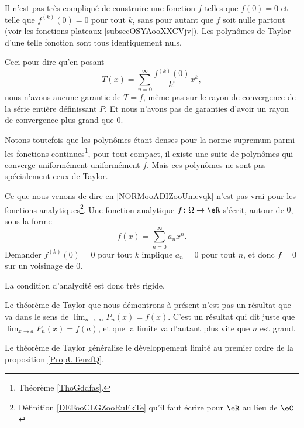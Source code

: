 \begin{normaltext}      \label{NORMooADIZooUmevqk}
    Il n'est pas très compliqué de construire une fonction \( f\) telles que \( f(0)=0\) et telle que \( f^{(k)}(0)=0\) pour tout \( k\), sans pour autant que \( f\) soit nulle partout (voir les fonctions plateaux \ref{subsecOSYAooXXCVjv}). Les polynômes de Taylor d'une telle fonction sont tous identiquement nuls.

    Ceci pour dire qu'en posant
    \begin{equation}
        T(x)=\sum_{n=0}^{\infty}\frac{ f^{(k)}(0) }{ k! }x^k,
    \end{equation}
    nous n'avons aucune garantie de \( T=f\), même pas sur le rayon de convergence de la série entière définissant \( P\). Et nous n'avons pas de garanties d'avoir un rayon de convergence plus grand que \( 0\).

    Notons toutefois que les polynômes étant denses pour la norme supremum parmi les fonctions continues\footnote{Théorème \ref{ThoGddfas}.}, pour tout compact, il existe une suite de polynômes qui converge uniformément uniformément \( f\). Mais ces polynômes ne sont pas spécialement ceux de Taylor.
\end{normaltext}

\begin{normaltext}
    Ce que nous venons de dire en \ref{NORMooADIZooUmevqk} n'est pas vrai pour les fonctions analytiques\footnote{Définition \ref{DEFooCLGZooRuEkTe} qu'il faut écrire pour \( \eR\) au lieu de $\eC$}. Une fonction analytique \( f\colon \Omega\to \eR\) s'écrit, autour de \( 0\), sous la forme
    \begin{equation}
        f(x)=\sum_{n=0}^{\infty}a_nx^n.
    \end{equation}
    Demander \( f^{(k)}(0)=0\) pour tout \( k\) implique \( a_n=0\) pour tout \( n\), et donc \( f=0\) sur un voisinage de \( 0\).

    La condition d'analycité est donc très rigide.
\end{normaltext}

Le théorème de Taylor que nous démontrons à présent n'est pas un résultat que va dans le sens de \( \lim_{n\to \infty} P_n(x)=f(x)\). C'est un résultat qui dit juste que \( \lim_{x\to a} P_n(x)=f(a)\), et que la limite va d'autant plus vite que \( n\) est grand.

Le théorème de Taylor généralise le développement limité au premier ordre de la proposition \ref{PropUTenzfQ}.

